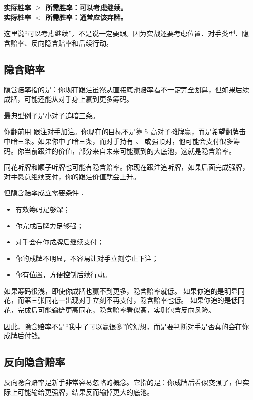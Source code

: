 \begin{center}
\textbf{实际胜率 $\geq$ 所需胜率：可以考虑继续。\\
实际胜率 $<$ 所需胜率：通常应该弃牌。}
\end{center}

这里说“可以考虑继续”，不是说一定要跟。因为实战还要考虑位置、对手类型、隐含赔率、反向隐含赔率和后续行动。

\subsection{隐含赔率}

隐含赔率指的是：你现在跟注虽然从直接底池赔率看不一定完全划算，但如果后续成牌，可能还能从对手身上赢到更多筹码。

最典型例子是小对子追暗三条。

你翻前用  跟注对手加注。你现在的目标不是靠 5 高对子摊牌赢，而是希望翻牌击中暗三条。如果你中了暗三条，而对手持有 、 或强顶对，他可能会支付很多筹码。你当前跟注的价值，部分来自未来可能赢到的大底池，这就是隐含赔率。

同花听牌和顺子听牌也可能有隐含赔率。你现在跟注追听牌，如果后面完成强牌，对手愿意继续支付，你的跟注价值就会上升。

但隐含赔率成立需要条件：

\begin{itemize}
\item 有效筹码足够深；
\item 你完成后牌力足够强；
\item 对手会在你成牌后继续支付；
\item 你的成牌不明显，不容易让对手立刻停止下注；
\item 你有位置，方便控制后续行动。
\end{itemize}

如果筹码很浅，即使你成牌也赢不到更多，隐含赔率就低。
如果你追的是明显同花，而第三张同花一出现对手立刻不再支付，隐含赔率也低。
如果你追的是低同花，完成后可能输给更高同花，隐含赔率看似高，实则包含反向风险。

因此，隐含赔率不是“我中了可以赢很多”的幻想，而是要判断对手是否真的会在你成牌后付钱。

\subsection{反向隐含赔率}

反向隐含赔率是新手非常容易忽略的概念。它指的是：你成牌后看似变强了，但实际上可能输给更强牌，结果反而输掉更大的底池。

